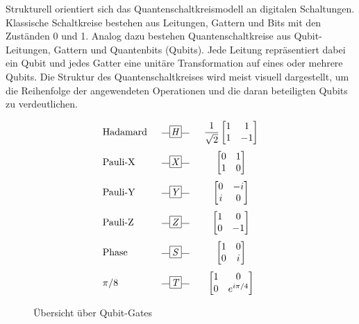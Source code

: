 Strukturell orientiert sich das Quantenschaltkreismodell an digitalen Schaltungen. Klassische Schaltkreise bestehen aus Leitungen, Gattern und Bits mit den Zuständen 0 und 1. Analog dazu bestehen Quantenschaltkreise aus Qubit-Leitungen, Gattern und Quantenbits (Qubits). Jede Leitung repräsentiert dabei ein Qubit und jedes Gatter eine unitäre Transformation auf eines oder mehrere Qubits. Die Struktur des Quantenschaltkreises wird meist visuell dargestellt, um die Reihenfolge der angewendeten Operationen und die daran beteiligten Qubits zu verdeutlichen.

\begin{figure}[ht!]
\centering
\[
\begin{array}{l @{\hspace{1.5em}} c @{\hspace{1.5em}} c}
\text{Hadamard} 
& \rule[0.4ex]{0.8em}{0.4pt}\tikz[baseline=(X.base)] \node[draw, minimum size=1.2em, inner sep=0pt] (X) {\textit{H}}; \rule[0.4ex]{0.8em}{0.4pt}
& \dfrac{1}{\sqrt{2}} \begin{bmatrix} 1 & 1 \\ 1 & -1 \end{bmatrix} \\[3ex]
\text{Pauli-X}  
& \rule[0.4ex]{0.8em}{0.4pt}\tikz[baseline=(X.base)] \node[draw, minimum size=1.2em, inner sep=0pt] (X) {\textit{X}}; \rule[0.4ex]{0.8em}{0.4pt}
& \begin{bmatrix} 0 & 1 \\ 1 & 0 \end{bmatrix} \\[3ex]
\text{Pauli-Y}  
& \rule[0.4ex]{0.8em}{0.4pt}\tikz[baseline=(X.base)] \node[draw, minimum size=1.2em, inner sep=0pt] (X) {\textit{Y}}; \rule[0.4ex]{0.8em}{0.4pt}
& \begin{bmatrix} 0 & -i \\ i & 0 \end{bmatrix} \\[3ex]
\text{Pauli-Z}  
& \rule[0.4ex]{0.8em}{0.4pt}\tikz[baseline=(X.base)] \node[draw, minimum size=1.2em, inner sep=0pt] (X) {\textit{Z}}; \rule[0.4ex]{0.8em}{0.4pt}
& \begin{bmatrix} 1 & 0 \\ 0 & -1 \end{bmatrix} \\[3ex]
\text{Phase}    
& \rule[0.4ex]{0.8em}{0.4pt}\tikz[baseline=(X.base)] \node[draw, minimum size=1.2em, inner sep=0pt] (X) {\textit{S}}; \rule[0.4ex]{0.8em}{0.4pt}
& \begin{bmatrix} 1 & 0 \\ 0 & i \end{bmatrix} \\[3ex]
\text{$\pi/8$}         
& \rule[0.4ex]{0.8em}{0.4pt}\tikz[baseline=(X.base)] \node[draw, minimum size=1.2em, inner sep=0pt] (X) {\textit{T}}; \rule[0.4ex]{0.8em}{0.4pt}
& \begin{bmatrix} 1 & 0 \\ 0 & e^{i\pi/4} \end{bmatrix} \\
\end{array}
\]
\caption{Übersicht über Qubit-Gates \autocite[177]{nielsen_quantum_2010}}
\label{fig:qubit-gates}
\end{figure}

